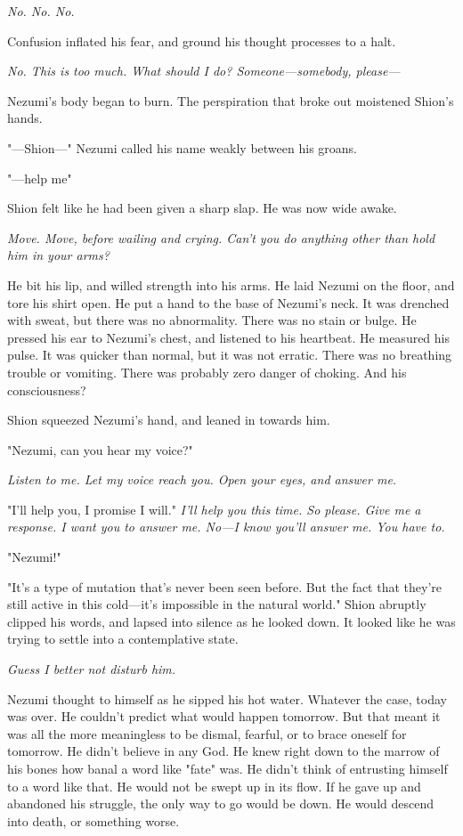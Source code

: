 \emph{No. No. No.}

Confusion inflated his fear, and ground his thought processes to a halt.

\emph{No. This is too much. What should I do? Someone---somebody, please---}

Nezumi's body began to burn. The perspiration that broke out moistened
Shion's hands.

"---Shion---" Nezumi called his name weakly between his groans.

"---help me\el "

Shion felt like he had been given a sharp slap. He was now wide awake.

\emph{Move. Move, before wailing and crying. Can't you do anything other than
hold him in your arms?}

He bit his lip, and willed strength into his arms. He laid Nezumi on the
floor, and tore his shirt open. He put a hand to the base of Nezumi's
neck. It was drenched with sweat, but there was no abnormality. There
was no stain or bulge. He pressed his ear to Nezumi's chest, and
listened to his heartbeat. He measured his pulse. It was quicker than
normal, but it was not erratic. There was no breathing trouble or
vomiting. There was probably zero danger of choking. And his
consciousness?

Shion squeezed Nezumi's hand, and leaned in towards him.

"Nezumi, can you hear my voice?"

\emph{Listen to me. Let my voice reach you. Open your eyes, and answer me.}

"I'll help you, I promise I will." \emph{I'll help you this time. So please.
Give me a response. I want you to answer me. No---I know you'll answer me.
You have to.}

"Nezumi!"

\mybreak

"It's a type of mutation that's never been seen before. But the fact
that they're still active in this cold---it's impossible in the natural
world." Shion abruptly clipped his words, and lapsed into silence as he
looked down. It looked like he was trying to settle into a contemplative
state.

\emph{Guess I better not disturb him.}

Nezumi thought to himself as he sipped his hot water. Whatever the case,
today was over. He couldn't predict what would happen tomorrow. But that
meant it was all the more meaningless to be dismal, fearful, or to brace
oneself for tomorrow. He didn't believe in any God. He knew right down
to the marrow of his bones how banal a word like "fate" was. He didn't
think of entrusting himself to a word like that. He would not be swept
up in its flow. If he gave up and abandoned his struggle, the only way
to go would be down. He would descend into death, or something worse.

